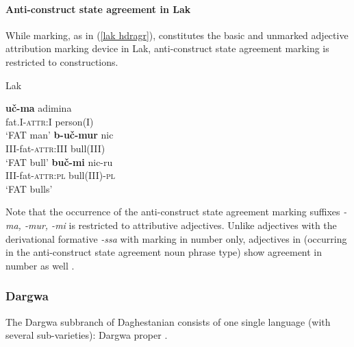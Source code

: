 \paragraph*{Anti\hyp{}construct state agreement in Lak}
While  marking, as in (\ref{lak hdragr}), constitutes the basic and unmarked adjective attribution marking device in Lak, anti\hyp{}construct state agreement marking is restricted to  constructions.
\begin{exe}
\ex 
\rm{Lak \citep[45]{zirkov1955}}%
\begin{xlist}
\ex
\gll	\textbf{uč-ma} adimina\\
	fat.\textsc{I}-\textsc{attr:I} person\textsc{(I)}\\
\glt	‘FAT man’
\ex
\gll	\textbf{b-uč-mur} nic\\
	\textsc{III}-fat-\textsc{attr:III} bull\textsc{(III)}\\
\glt	‘FAT bull’
\ex
\gll	\textbf{buč-mi} nic-ru\\
	\textsc{III}-fat-\textsc{attr:pl} bull\textsc{(III)}-\textsc{pl}\\
\glt	‘FAT bulls’
\end{xlist}
\end{exe}
Note that the occurrence of the anti\hyp{}construct state agreement marking suffixes \textit{-ma, -mur, -mi} is restricted to attributive adjectives. Unlike adjectives with the derivational formative \textit{-ssa} with  marking in number only, adjectives in  (occurring in the anti\hyp{}construct state agreement noun phrase type) show agreement in number as well \citep[45–51]{zirkov1955}.

\subsubsection{Dargwa}
The Dargwa subbranch of Daghestanian consists of one single language (with several sub-varieties): Dargwa proper \cite[233]{salminen2007}.

